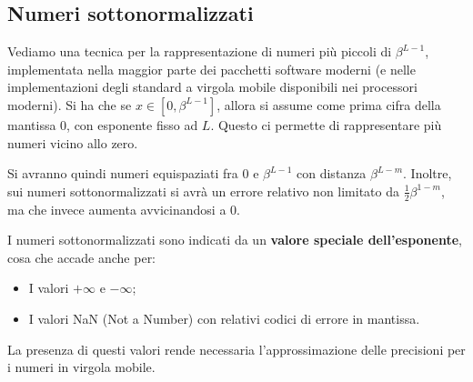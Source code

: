 \documentclass[a4paper,11pt]{article}
\begin{document}
\subsection{Numeri sottonormalizzati}
Vediamo una tecnica per la rappresentazione di numeri più piccoli di $\beta^{L - 1}$, implementata nella maggior parte dei pacchetti software moderni (e nelle implementazioni degli standard a virgola mobile disponibili nei processori moderni).
Si ha che se $x \in [0, \beta^{L - 1}]$, allora si assume come prima cifra della mantissa $0$, con esponente fisso ad $L$. 
Questo ci permette di rappresentare più numeri vicino allo zero. 

Si avranno quindi numeri equispaziati fra 0 e $\beta^{L - 1}$ con distanza $\beta^{L - m}$.
Inoltre, sui numeri sottonormalizzati si avrà un errore relativo non limitato da $\frac{1}{2} \beta^{1 - m}$, ma che invece aumenta avvicinandosi a 0. 

I numeri sottonormalizzati sono indicati da un \textbf{valore speciale dell'esponente}, cosa che accade anche per:
\begin{itemize}
	\item I valori $+\infty$ e $-\infty$;
	\item I valori NaN (Not a Number) con relativi codici di errore in mantissa.
\end{itemize}

La presenza di questi valori rende necessaria l'approssimazione delle precisioni per i numeri in virgola mobile.
\end{document}
